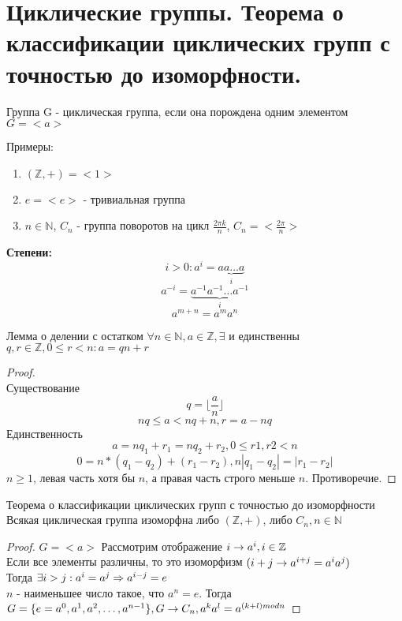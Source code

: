 \section{Циклические группы. Теорема о классификации циклических групп с точностью до изоморфности.}
\begin{Def}
	Группа G - циклическая группа, если она порождена одним элементом
	$G = <a>$
\end{Def}

Примеры:
\begin{enumerate}
	\item $(\mathbb{Z}, +) = <1>$
	\item ${e} = <e>$ - тривиальная группа
	\item $n \in \mathbb{N}$, $C_n$ - группа поворотов на цикл $\frac{2\pi k}{n}$, $C_n = <\frac{2\pi}{n}>$
\end{enumerate}

{\bf Степени:}
$$i > 0: a^i = \underbrace{aa \ldots a}_{i}$$
$$a^{-i} = \underbrace{a^{-1}a^{-1} \ldots a^{-1}}_{i}$$
$$a^{m + n} = a^ma^n$$
\begin{theorem}{Лемма о делении с остатком}
	$\forall n \in \mathbb{N}, a \in \mathbb{Z}, \exists$ и единственны $q, r \in \mathbb{Z},  0 \leqslant r < n: a = qn + r$
\end{theorem}
\begin{proof}
\\	Существование
	$$q = \lfloor \frac{a}{n} \rfloor$$
	$$nq \leqslant a < nq + n, r = a - nq$$
	Единственность
	$$a = nq_1 + r_1 = nq_2 + r_2, 0 \leqslant r1, r2 < n$$
	$$0 = n * (q_1 - q_2) + (r_1 - r_2), n|q_1 - q_2| = |r_1 - r_2|$$
	$n \geqslant 1$, левая часть хотя бы $n$, а правая часть строго меньше $n$. Противоречие.
\end{proof}

\begin{theorem}{Теорема о классификации циклических групп с точностью до изоморфности}
	Всякая циклическая группа изоморфна либо $(\mathbb{Z}, +)$, либо $C_n, n \in \mathbb{N}$
\end{theorem}
\begin{proof}
	$G = <a>$
	Рассмотрим отображение $i \rightarrow a^i, i \in \mathbb{Z}$                              \\
	Если все элементы различны, то это изоморфизм $(i + j \rightarrow a^{i+j} = a^i a^j)$ \\
	Тогда $\exists i > j: a^i = a^j \Rightarrow a^{i-j}=e$	                                \\
	$n$ - наименьшее число такое, что $a^n = e$. Тогда $G = \{e = a^0, a^1, a^2, \dots, a^{n-1} \}, G \rightarrow C_n, a^k a^l = a^{(k+l) mod n}$	
\end{proof}

